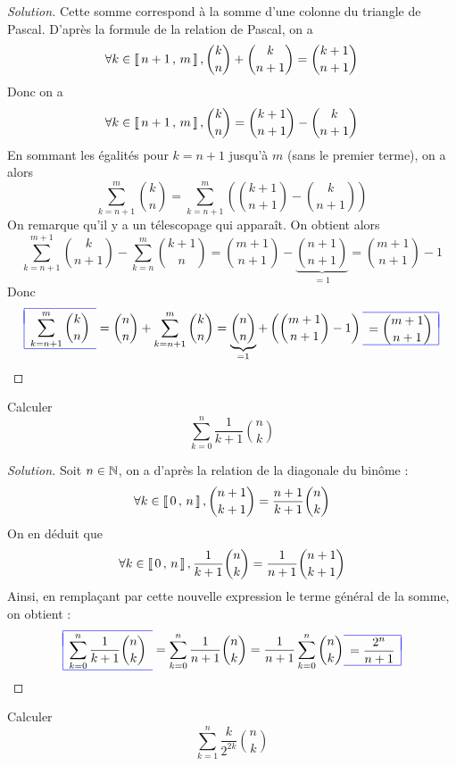 \documentclass{classe}
\newcommand{\lboxed}[1]{{\color{blue}\begin{array}{|l}\hline\\[-2.4ex]{\color{black}#1}\\[1.2ex]\hline\end{array}}}
\newcommand{\rboxed}[1]{{\color{blue}\begin{array}{r|}\hline\\[-2.4ex]{\color{black}#1}\\[1.2ex]\hline\end{array}}}
\newenvironment{solution}
  {\renewcommand\qedsymbol{$\blacksquare$}\begin{proof}[Solution]}
  {\end{proof}}
\begin{document}
\begin{solution}
Cette somme correspond à la somme d'une colonne du triangle de Pascal. D'après la formule de la relation de Pascal, on a 
\[
\forall k \in \left\llbracket \, n+1 \, , \, m \, \right\rrbracket,\binom{k}{n} + \binom{k}{n+1} = \binom{k+1}{n+1} 
\]
Donc on a
\[
\forall k \in \left\llbracket \, n+1 \, , \, m \, \right\rrbracket,\binom{k}{n} = \binom{k+1}{n+1} - \binom{k}{n+1}
\]
En sommant les égalités pour $k=n+1$ jusqu'à $m$ (sans le premier terme), on a alors
\[
\displaystyle\sum\limits_{k=n+1}^{m} \binom{k}{n} 
= \displaystyle\sum\limits_{k=n+1}^{m} \left(\binom{k+1}{n+1} - \binom{k}{n+1}\right)
\]
On remarque qu'il y a un télescopage qui apparaît. On obtient alors
\[
\displaystyle\sum\limits_{k=n+1}^{m+1} \binom{k}{n+1}
- \displaystyle\sum\limits_{k=n}^{m} \binom{k+1}{n}
= \binom{m+1}{n+1} - \underbrace{\binom{n+1}{n+1}}_{=1}
= \binom{m+1}{n+1} - 1
\]
Donc 
\[
\lboxed{\displaystyle\sum\limits_{k=n+1}^{m} \binom{k}{n}}
= \binom{n}{n} + \displaystyle\sum\limits_{k=n+1}^{m} \binom{k}{n} 
= \underbrace{\binom{n}{n}}_{=1} + \left(\binom{m+1}{n+1} - 1\right)
\rboxed{= \displaystyle\binom{m+1}{n+1}}
\]
\end{solution}

\begin{exercice}
Calculer 
\[
\displaystyle\sum\limits_{k=0}^{n} \dfrac{1}{k+1}\binom{n}{k}
\]
\end{exercice}

\begin{solution}
Soit $n \in \mathbb{N}$, on a d'après la relation de la diagonale du binôme :
\[\forall k \in \left\llbracket \, 0 \, , \, n \, \right\rrbracket, \binom{n+1}{k+1} = \dfrac{n+1}{k+1}\binom{n}{k}
\]
On en déduit que
\[
\forall k \in \left\llbracket \, 0 \, , \, n \, \right\rrbracket, \dfrac{1}{k+1}\binom{n}{k} = \dfrac{1}{n+1}\binom{n+1}{k+1}
\]
Ainsi, en remplaçant par cette nouvelle expression le terme général de la somme, on obtient :
\[
\lboxed{\displaystyle\sum\limits_{k=0}^{n} \dfrac{1}{k+1}\binom{n}{k}}
=  \displaystyle\sum\limits_{k=0}^{n} \dfrac{1}{n+1}\binom{n}{k} 
= \dfrac{1}{n+1} \displaystyle\sum\limits_{k=0}^{n} \binom{n}{k}
\rboxed{= \dfrac{2^n}{n+1}}
\]
\end{solution}

\begin{exercice}
Calculer 
\[
\displaystyle\sum\limits_{k=1}^{n} \dfrac{k}{2^{2k}}\binom{n}{k}
\]
\end{exercice}
\end{document}
